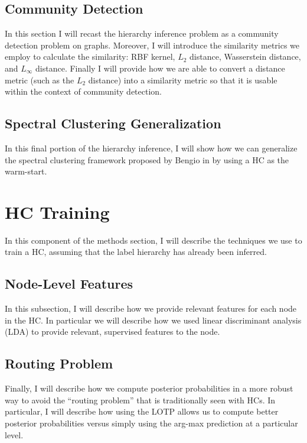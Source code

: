 \documentclass[../thesis.tex]{subfiles}
\begin{document}
\subsection{Community Detection}
In this section I will recast the hierarchy inference problem as a community detection problem on graphs. Moreover, I will introduce the similarity metrics we employ to calculate the similarity: RBF kernel, $L_2$ distance, Wasserstein distance, and $L_\infty$ distance. Finally I will provide how we are able to convert a distance metric (such as the $L_2$ distance) into a similarity metric so that it is usable within the context of community detection.

\subsection{Spectral Clustering Generalization}
In this final portion of the hierarchy inference, I will show how we can generalize the spectral clustering framework proposed by Bengio in \cite{bengio2010label} by using a HC as the warm-start.

\section{HC Training}
In this component of the methods section, I will describe the techniques we use to train a HC, assuming that the label hierarchy has already been inferred.

\subsection{Node-Level Features}
In this subsection, I will describe how we provide relevant features for each node in the HC. In particular we will describe how we used linear discriminant analysis (LDA) to provide relevant, supervised features to the node.

\subsection{Routing Problem}
Finally, I will describe how we compute posterior probabilities in a more robust way to avoid the ``routing problem'' that is traditionally seen with HCs. In particular, I will describe how using the LOTP allows us to compute better posterior probabilities versus simply using the arg-max prediction at a particular level. 
\end{document}
